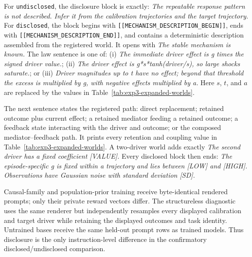 For \texttt{undisclosed}, the disclosure block is exactly: \emph{The repeatable
response pattern is not described. Infer it from the calibration trajectories
and the target trajectory.} For \texttt{disclosed}, the block begins with
\texttt{[[MECHANISM\_DESCRIPTION\_BEGIN]]}, ends with
\texttt{[[MECHANISM\_DESCRIPTION\_END]]}, and contains a deterministic
description assembled from the registered world. It opens with \emph{The stable
mechanism is known.} The law sentence is one of: (i) \emph{The immediate driver
effect is g times the signed driver value.}; (ii) \emph{The driver effect is
g*s*tanh(driver/s), so large shocks saturate.}; or (iii) \emph{Driver magnitudes
up to t have no effect; beyond that threshold the excess is multiplied by g,
with negative effects multiplied by a.} Here $s$, $t$, and $a$ are replaced by
the values in Table~\ref{tab:exp3-expanded-worlds}.

The next sentence states the registered path: direct replacement; retained
outcome plus current effect; a retained mediator feeding a retained outcome; a
feedback state interacting with the driver and outcome; or the composed
mediator--feedback path. It prints every retention and coupling value in
Table~\ref{tab:exp3-expanded-worlds}. A two-driver world adds exactly
\emph{The second driver has a fixed coefficient [VALUE].} Every disclosed block
then ends: \emph{The episode-specific g is fixed within a trajectory and lies
between [LOW] and [HIGH]. Observations have Gaussian noise with standard
deviation [SD].}

Causal-family and population-prior training receive byte-identical rendered
prompts; only their private reward vectors differ. The structureless diagnostic
uses the same renderer but independently resamples every displayed calibration
and target driver while retaining the displayed outcomes and task identity.
Untrained bases receive the same held-out prompt rows as trained models. Thus
disclosure is the only instruction-level difference in the confirmatory
disclosed/undisclosed comparison.


